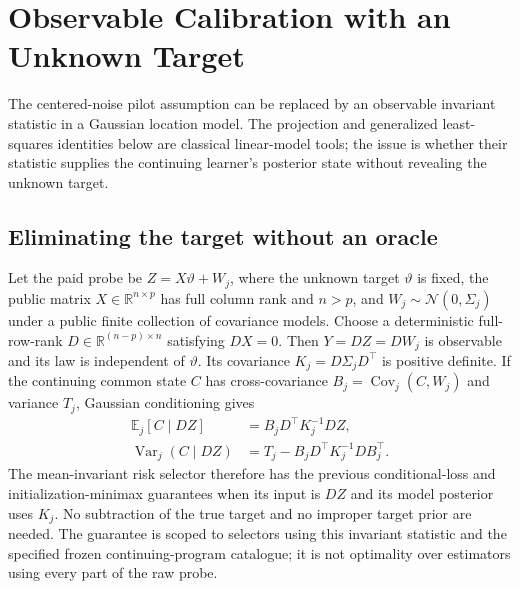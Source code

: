 \section{Observable Calibration with an Unknown Target}
The centered-noise pilot assumption can be replaced by an observable invariant statistic in a Gaussian location model.
The projection and generalized least-squares identities below are classical linear-model tools; the issue is whether their statistic supplies the continuing learner's posterior state without revealing the unknown target.

\subsection{Eliminating the target without an oracle}
Let the paid probe be $Z=X\vartheta+W_j$, where the unknown target $\vartheta$ is fixed, the public matrix $X\in\mathbb R^{n\times p}$ has full column rank and $n>p$, and $W_j\sim\mathcal N(0,\Sigma_j)$ under a public finite collection of covariance models.
Choose a deterministic full-row-rank $D\in\mathbb R^{(n-p)\times n}$ satisfying $DX=0$.
Then $Y=DZ=DW_j$ is observable and its law is independent of $\vartheta$.
Its covariance $K_j=D\Sigma_jD^\top$ is positive definite.
If the continuing common state $C$ has cross-covariance $B_j=\operatorname{Cov}_j(C,W_j)$ and variance $T_j$, Gaussian conditioning gives
\begin{align*}
\mathbb E_j[C\mid DZ]&=B_jD^\top K_j^{-1}DZ,\\
\operatorname{Var}_j(C\mid DZ)&=T_j-B_jD^\top K_j^{-1}DB_j^\top.
\end{align*}
The mean-invariant risk selector therefore has the previous conditional-loss and initialization-minimax guarantees when its input is $DZ$ and its model posterior uses $K_j$.
No subtraction of the true target and no improper target prior are needed.
The guarantee is scoped to selectors using this invariant statistic and the specified frozen continuing-program catalogue; it is not optimality over estimators using every part of the raw probe.


